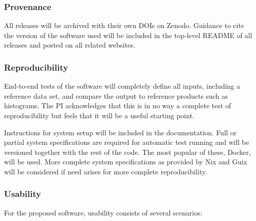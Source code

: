 \subsubsection*{Provenance}
All releases will be archived with their own DOIs on Zenodo.  Guidance to cite the version of the software used will be included in the top-level README of all releases and posted on all related websites.

\subsubsection*{Reproducibility}
End-to-end tests of the software will completely define all inputs, including a reference data set, and compare the output to reference products such as histograms.  The PI acknowledges that this is in no way a complete test of reproducibility but feels that it will be a useful starting point.  

Instructions for system setup will be included in the documentation.  Full or partial system specifications are required for automatic test running and will be versioned together with the rest of the code.  The most popular of these, Docker, will be used.  More complete system specifications as provided by Nix and Guix will be considered if need arises for more complete reproducibility.

\subsubsection*{Usability}
For the proposed software, usability consists of several scenarios:


